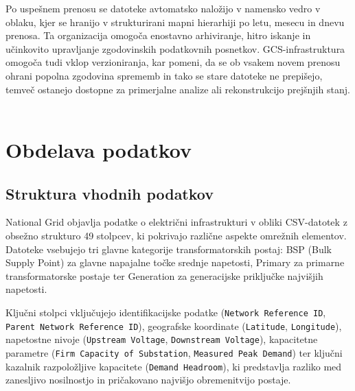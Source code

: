 \documentclass[a4paper,12pt,openright]{book}
\begin{document}
Po uspešnem prenosu se datoteke avtomatsko naložijo v namensko vedro v oblaku, kjer se hranijo v strukturirani mapni hierarhiji po letu, mesecu in dnevu prenosa. Ta organizacija omogoča enostavno arhiviranje, hitro iskanje in učinkovito upravljanje zgodovinskih podatkovnih posnetkov. GCS-infrastruktura omogoča tudi vklop verzioniranja, kar pomeni, da se ob vsakem novem prenosu ohrani popolna zgodovina sprememb in tako se stare datoteke ne prepišejo, temveč ostanejo dostopne za primerjalne analize ali rekonstrukcijo prejšnjih stanj. ~\cite{ramukadataanalyticsgcp}

\section{Obdelava podatkov}

\subsection{Struktura vhodnih podatkov}

National Grid objavlja podatke o električni infrastrukturi v obliki CSV-datotek z obsežno strukturo 49 stolpcev, ki pokrivajo različne aspekte omrežnih elementov. Datoteke vsebujejo tri glavne kategorije transformatorskih postaj: BSP (Bulk Supply Point) za glavne napajalne točke srednje napetosti, Primary za primarne transformatorske postaje ter Generation za generacijske priključke najvišjih napetosti.

Ključni stolpci vključujejo identifikacijske podatke (\texttt{Network Reference ID}, \texttt{Parent Network Reference ID}), geografske koordinate (\texttt{Latitude}, \texttt{Longitude}), napetostne nivoje (\texttt{Upstream Voltage}, \texttt{Downstream Voltage}), kapacitetne parametre (\texttt{Firm Capacity of Substation}, \texttt{Measured Peak Demand}) ter ključni kazalnik razpoložljive kapacitete (\texttt{Demand Headroom}), ki predstavlja razliko med zanesljivo nosilnostjo in pričakovano najvišjo obremenitvijo postaje.
\end{document}
